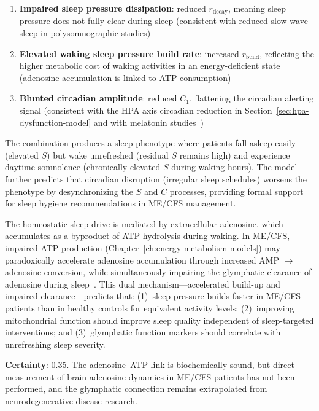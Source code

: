 \begin{enumerate}
    \item \textbf{Impaired sleep pressure dissipation}: reduced $r_{\text{decay}}$, meaning sleep pressure does not fully clear during sleep (consistent with reduced slow-wave sleep in polysomnographic studies)
    \item \textbf{Elevated waking sleep pressure build rate}: increased $r_{\text{build}}$, reflecting the higher metabolic cost of waking activities in an energy-deficient state (adenosine accumulation is linked to ATP consumption)
    \item \textbf{Blunted circadian amplitude}: reduced $C_1$, flattening the circadian alerting signal (consistent with the HPA axis circadian reduction in Section~\ref{sec:hpa-dysfunction-model} and with melatonin studies~\cite{castromarrero2021melatonin})
\end{enumerate}

The combination produces a sleep phenotype where patients fall asleep easily (elevated $S$) but wake unrefreshed (residual $S$ remains high) and experience daytime somnolence (chronically elevated $S$ during waking hours). The model further predicts that circadian disruption (irregular sleep schedules) worsens the phenotype by desynchronizing the $S$ and $C$ processes, providing formal support for sleep hygiene recommendations in ME/CFS management.

\begin{hypothesis}
The homeostatic sleep drive is mediated by extracellular adenosine, which accumulates as a byproduct of ATP hydrolysis during waking. In ME/CFS, impaired ATP production (Chapter~\ref{ch:energy-metabolism-models}) may paradoxically accelerate adenosine accumulation through increased AMP $\to$ adenosine conversion, while simultaneously impairing the glymphatic clearance of adenosine during sleep~\cite{Xie2013glymphatic,NematGorgani2025glymphatic}. This dual mechanism---accelerated build-up and impaired clearance---predicts that: (1)~sleep pressure builds faster in ME/CFS patients than in healthy controls for equivalent activity levels; (2)~improving mitochondrial function should improve sleep quality independent of sleep-targeted interventions; and (3)~glymphatic function markers should correlate with unrefreshing sleep severity.

\textbf{Certainty}: 0.35. The adenosine--ATP link is biochemically sound, but direct measurement of brain adenosine dynamics in ME/CFS patients has not been performed, and the glymphatic connection remains extrapolated from neurodegenerative disease research.
\end{hypothesis}

